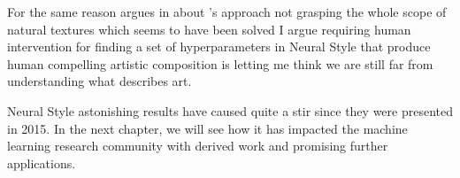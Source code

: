 For the same reason \citeauthor{Gatys2015A} argues in \cite{Gatys2015A} about \citet{Portilla2000}'s approach not grasping the whole scope of natural textures which seems to have been solved I argue requiring human intervention for finding a set of hyperparameters in Neural Style that produce human compelling artistic composition is letting me think we are still far from understanding what describes art.

Neural Style astonishing results have caused quite a stir since they were presented in 2015.
In the next chapter, we will see how it has impacted the machine learning research community with derived work and promising further applications.




